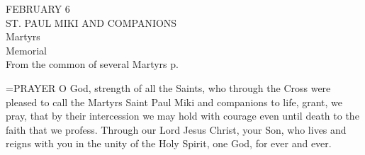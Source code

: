 \begin{center}\normalsize FEBRUARY 6\\
\footnotesize ST. PAUL MIKI AND COMPANIONS\\
\footnotesize Martyrs\\
\footnotesize Memorial\\
\footnotesize From the common of several Martyrs p. \\
\end{center}

\hangindent=\parindent \small{PRAYER 
O God, strength of all the Saints,
who through the Cross were pleased to call
the Martyrs Saint Paul Miki and companions to life,
grant, we pray, that by their intercession
we may hold with courage even until death
to the faith that we profess.
Through our Lord Jesus Christ, your Son,
who lives and reigns with you in the unity of the Holy Spirit, one God, for ever and ever.\\}
 

